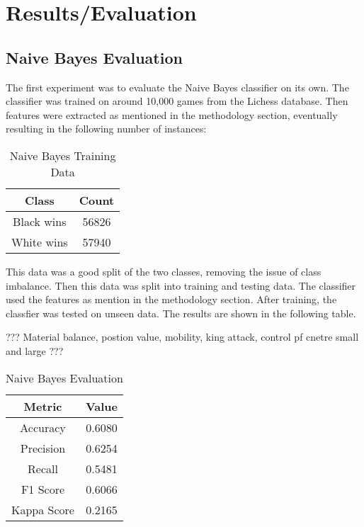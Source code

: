 \pgfplotsset{compat=1.17} %


\chapter{Results/Evaluation}


\section{Naive Bayes Evaluation}

The first experiment was to evaluate the Naive Bayes classifier on its own. The classifier was trained on around 10,000 games from the Lichess database. Then features were extracted as mentioned in the methodology section, eventually resulting in the following number of instances:

\begin{table}[H]
    \centering
    \begin{tabular}{|c|c|}
    \hline
    \textbf{Class} & \textbf{Count}  \\ \hline
    Black wins             & 56826           \\ \hline
    White wins              & 57940           \\ \hline
    \end{tabular}
    \caption{Naive Bayes Training Data}
    \label{tab:naive_bayes_training_data}
\end{table}




This data was a good split of the two classes, removing the issue of class imbalance. Then this data was split into training and testing data.
 The classifier used the features as mention in the methodology section. After training, the classfier was tested on unseen data. The results are shown in the following table.

???  Material balance, postion value, mobility, king attack, control pf cnetre small and large   ???

\begin{table}[H]
    \centering
    \begin{tabular}{|c|c|}
    \hline
    \textbf{Metric} & \textbf{Value}  \\ \hline
    Accuracy        & 0.6080           \\ \hline
    Precision       & 0.6254           \\ \hline
    Recall          & 0.5481           \\ \hline
    F1 Score        & 0.6066           \\ \hline
    Kappa Score     & 0.2165           \\ \hline
    \end{tabular}
    \caption{Naive Bayes Evaluation}
    \label{tab:naive_bayes_evaluation}
\end{table}

